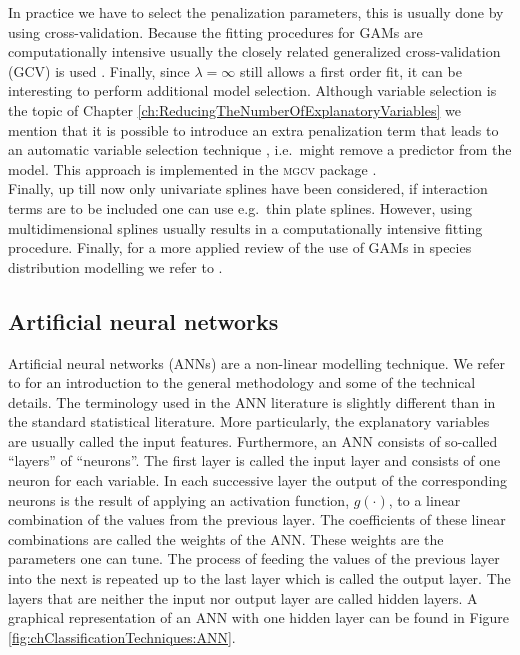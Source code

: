 In practice we have to select the penalization parameters, this is usually done by using cross-validation. Because the fitting procedures for GAMs are computationally intensive usually the closely related generalized cross-validation (GCV) is used \parencite{wood_gams_2002}. Finally, since $\lambda = \infty$ still allows a first order fit, it can be interesting to perform additional model selection. Although variable selection is the topic of Chapter \ref{ch:ReducingTheNumberOfExplanatoryVariables} we mention that it is possible to introduce an extra penalization term that leads to an automatic variable selection technique \parencite{marra_practical_2011}, i.e.\ might remove a predictor from the model. This approach is implemented in the \textsc{mgcv} package \parencite{mgcv}. \\

Finally, up till now only univariate splines have been considered, if interaction terms are to be included one can use e.g.\ thin plate splines. However, using multidimensional splines usually results in a computationally intensive fitting procedure. Finally, for a more applied review of the use of GAMs in species distribution modelling we refer to \cite{guisan_generalized_2002}.

\subsection{Artificial neural networks}
\label{sec:ANN}
Artificial neural networks (ANNs) are a non-linear modelling technique. We refer to \cite{bishop_neural_1995} for an introduction to the general methodology and some of the technical details. The terminology used in the ANN literature is slightly different than in the standard statistical literature. More particularly, the explanatory variables are usually called the input features. Furthermore, an ANN consists of so-called ``layers'' of ``neurons''. The first layer is called the input layer and consists of one neuron for each variable. In each successive layer the output of the corresponding neurons is the result of applying an activation function, $g(\cdot)$, to a linear combination of the values from the previous layer. The coefficients of these linear combinations are called the weights of the ANN. These weights are the parameters one can tune. The process of feeding the values of the previous layer into the next is repeated up to the last layer which is called the output layer. The layers that are neither the input nor output layer are called hidden layers. A graphical representation of an ANN with one hidden layer can be found in Figure \ref{fig:chClassificationTechniques:ANN}.\\

